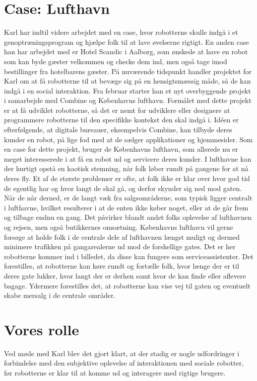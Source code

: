 \section{Case: Lufthavn}
\label{CaseLufthavn}
%
Karl har indtil videre arbejdet med en case, hvor robotterne skulle indgå i et genoptræningsprogram og hjælpe folk til at lave øvelserne rigtigt. En anden case han har arbejdet med er Hotel Scandic i Aalborg, som ønskede at have en robot som kan byde gæster velkommen og checke dem ind, men også tage imod bestillinger fra hotelbarens gæster. På nuværende tidspunkt handler projektet for Karl om at få robotterne til at bevæge sig på en hensigtsmæssig måde, så de kan indgå i en social interaktion. Fra februar starter han et nyt overbyggende projekt i samarbejde med Combine og Københavns lufthavn. Formålet med dette projekt er at få udviklet robotterne, så det er nemt for udviklere eller designere at programmere robotterne til den specifikke kontekst den skal indgå i. Idéen er efterfølgende, at digitale bureauer, eksempelvis Combine, kan tilbyde deres kunder en robot, på lige fod med at de sælger applikationer og hjemmesider. Som en case for dette projekt, bruger de Københavns lufthavn, som allerede nu er meget interesserede i at få en robot ud og servicere deres kunder.\blankline
%
I lufthavne kan der hurtigt opstå en kaotisk stemning, når folk løber rundt på gangene for at nå deres fly. Et af de største problemer er ofte, at folk ikke er klar over hvor god tid de egentlig har og hvor langt de skal gå, og derfor skynder sig ned mod gaten. Når de når derned, er de langt væk fra salgsområderne, som typisk ligger centralt i lufthavne, hvilket resulterer i at de enten ikke køber noget, eller at de går frem og tilbage endnu en gang. Det påvirker blandt andet folks oplevelse af lufthavnen og rejsen, men også butikkernes omsætning. Københavns lufthavn vil gerne forsøge at holde folk i de centrale dele af lufthavnen længst muligt og dermed minimere trafikken på gangarealerne ud mod de forskellige gates. Det er her robotterne kommer ind i billedet, da disse kan fungere som serviceassistenter. Det forestilles, at robotterne kan køre rundt og fortælle folk, hvor længe der er til deres gate lukker, hvor langt der er derhen samt hvor de kan finde eller aflevere bagage. Ydermere forestilles det, at robotterne kan vise vej til gaten og eventuelt skabe mersalg i de centrale områder.
%
\section{Vores rolle}
\label{VoresRolle}
%
Ved møde med Karl blev det gjort klart, at der stadig er nogle udfordringer i forbindelse med den subjektive oplevelse af interaktionen med sociale robotter, før robotterne er klar til at komme ud og interagere med rigtige brugere. 

